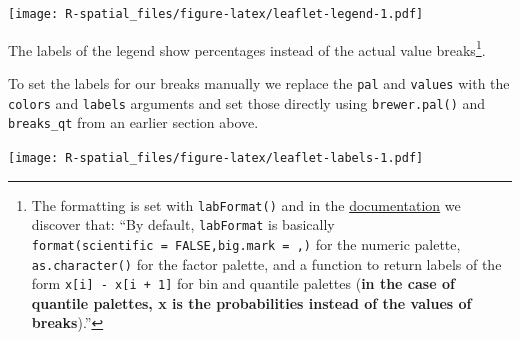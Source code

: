 \documentclass[]{book}
\newenvironment{Shaded}{\begin{snugshade}}{\end{snugshade}}
\newcommand{\KeywordTok}[1]{\textcolor[rgb]{0.13,0.29,0.53}{\textbf{#1}}}
\newcommand{\DataTypeTok}[1]{\textcolor[rgb]{0.13,0.29,0.53}{#1}}
\newcommand{\DecValTok}[1]{\textcolor[rgb]{0.00,0.00,0.81}{#1}}
\newcommand{\FloatTok}[1]{\textcolor[rgb]{0.00,0.00,0.81}{#1}}
\newcommand{\StringTok}[1]{\textcolor[rgb]{0.31,0.60,0.02}{#1}}
\newcommand{\OtherTok}[1]{\textcolor[rgb]{0.56,0.35,0.01}{#1}}
\newcommand{\OperatorTok}[1]{\textcolor[rgb]{0.81,0.36,0.00}{\textbf{#1}}}
\newcommand{\NormalTok}[1]{#1}
\let\rmarkdownfootnote\footnote%
\def\footnote{\protect\rmarkdownfootnote}
\theoremstyle{definition}
\theoremstyle{definition}
\theoremstyle{definition}
\theoremstyle{remark}
\begin{document}
\texttt{[image: R-spatial\_files/figure-latex/leaflet-legend-1.pdf]}

The labels of the legend show percentages instead of the actual value
breaks\footnote{The formatting is set with \texttt{labFormat()} and in
  the
  \href{https://cran.r-project.org/web/packages/leaflet/leaflet.pdf}{documentation}
  we discover that: ``By default, \texttt{labFormat} is basically
  \texttt{format(scientific\ =\ FALSE,big.mark\ =\ \textquotesingle{},\textquotesingle{})}
  for the numeric palette, \texttt{as.character()} for the factor
  palette, and a function to return labels of the form
  \texttt{x{[}i{]}\ -\ x{[}i\ +\ 1{]}} for bin and quantile palettes
  (\textbf{in the case of quantile palettes, x is the probabilities
  instead of the values of breaks}).''}.

To set the labels for our breaks manually we replace the \texttt{pal}
and \texttt{values} with the \texttt{colors} and \texttt{labels}
arguments and set those directly using \texttt{brewer.pal()} and
\texttt{breaks\_qt} from an earlier section above.

\begin{Shaded}
\end{Shaded}

\texttt{[image: R-spatial\_files/figure-latex/leaflet-labels-1.pdf]}
\end{document}
